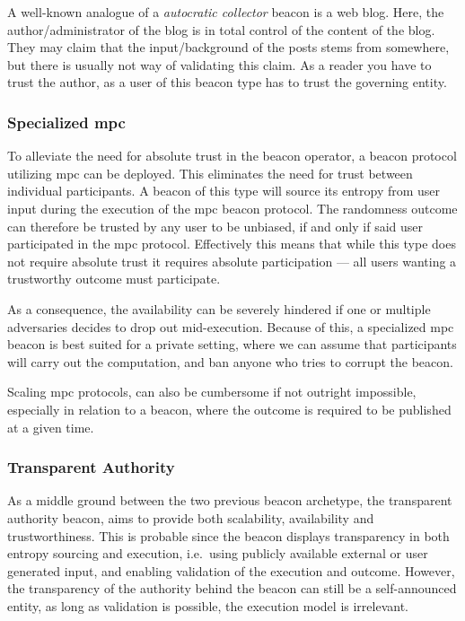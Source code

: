A well-known analogue of a \emph{autocratic collector} beacon is a web blog.
Here, the author/administrator of the blog is in total control of the content of the blog.
They may claim that the input/background of the posts stems from somewhere, but there is usually not way of validating this claim.
As a reader you have to trust the author, as a user of this beacon type has to trust the governing entity.

\subsubsection{Specialized \gls{mpc}}\label{ssub:specialized_mpc}
To alleviate the need for absolute trust in the beacon operator, a beacon protocol utilizing \acrfull{mpc} can be deployed.
This eliminates the need for trust between individual participants.
A beacon of this type will source its entropy from user input during the execution of the \gls{mpc} beacon protocol.
The randomness outcome can therefore be trusted by any user to be unbiased, if and only if said user participated in the \gls{mpc} protocol.
Effectively this means that while this type does not require absolute trust it requires absolute participation --- all users wanting a trustworthy outcome must participate.

As a consequence, the availability can be severely hindered if one or multiple adversaries decides to drop out mid-execution.
Because of this, a specialized \gls{mpc} beacon is best suited for a private setting, where we can assume that participants will carry out the computation, and ban anyone who tries to corrupt the beacon.

Scaling \gls{mpc} protocols, can also be cumbersome if not outright impossible, especially in relation to a beacon, where the outcome is required to be published at a given time.

\subsubsection{Transparent Authority}\label{ssub:transparent_authority}
As a middle ground between the two previous beacon archetype, the transparent authority beacon, aims to provide both scalability, availability and trustworthiness.
This is probable since the beacon displays transparency in both entropy sourcing and execution, i.e.\ using publicly available external or user generated input, and enabling validation of the execution and outcome.
However, the transparency of the authority behind the beacon can still be a self-announced entity, as long as validation is possible, the execution model is irrelevant.

